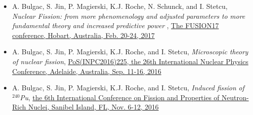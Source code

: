 \documentclass[letterpaper,12pt]{article}
\begin{document}
\begin{itemize}
\begin{itemize}
\item
A. Bulgac, S. Jin, P. Magierski, K.J. Roche, N. Schunck, and I. Stetcu, \textit{Nuclear Fission: from more phenomenology and adjusted parameters to more fundamental theory and increased predictive power }, \href{https://www.epj-conferences.org/articles/epjconf/abs/2017/32/epjconf_fusion2017_00007/epjconf_fusion2017_00007.html}{ The FUSION17 conference, Hobart, Australia, Feb. 20-24, 2017}

\item
A. Bulgac, S. Jin, P. Magierski, K.J. Roche, and I. Stetcu, \textit{Microscopic theory of nuclear fission}, \href{https://pos.sissa.it/cgi-bin/reader/contribution.cgi?id=281/225}{PoS(INPC2016)225, the 26th International Nuclear Physics Conference, Adelaide, Australia, Sep. 11-16, 2016}

\item
A. Bulgac, S. Jin, P. Magierski, K.J. Roche, and I. Stetcu, \textit{Induced fission of $^{240}$Pu}, \href{https://arxiv.org/abs/1702.08490}{the 6th International Conference on Fission and Properties of Neutron-Rich Nuclei, Sanibel Island, FL, Nov. 6-12, 2016}



\end{itemize}


\end{itemize}




     
\end{document}
